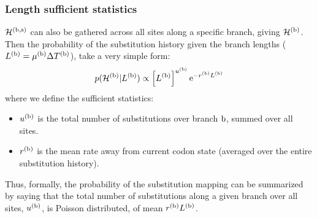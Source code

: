 \subsubsection{Length sufficient statistics}
$\mathcal{H}^{(\text{b}, \text{s})}$ can also be gathered across all sites along a specific branch, giving $\mathcal{H}^{(\text{b})}$.
Then the probability of the \gls{substitution} history given the branch lengths ($L^{(\text{b})} = \mu^{(\text{b})} \Delta T^{(\text{b})}$), take a very simple form:
\begin{equation}
    \label{eq:LengthSuffStat}
    p(\mathcal{H}^{(\text{b})} | L^{(\text{b})}) \propto \left[ L^{(\text{b})}\right]^{u^{(\text{b})}} \mathrm{e}^{- r^{(\text{b})} L^{(\text{b})}}
\end{equation}
where we define the sufficient statistics:
\begin{itemize}
    \setlength\itemsep{-0.25em}
    \item $u^{(\text{b})}$ is the total number of \glspl{substitution} over branch $\text{b}$, summed over all sites.
    \item $r^{(\text{b})}$ is the mean rate away from current \gls{codon} state (averaged over the entire \gls{substitution} history).
\end{itemize}
Thus, formally, the probability of the \gls{substitution} mapping can be summarized by saying that the total number of \glspl{substitution} along a given branch over all sites, $u^{(\text{b})}$, is Poisson distributed, of mean $r^{(\text{b})} L^{(\text{b})}$.


